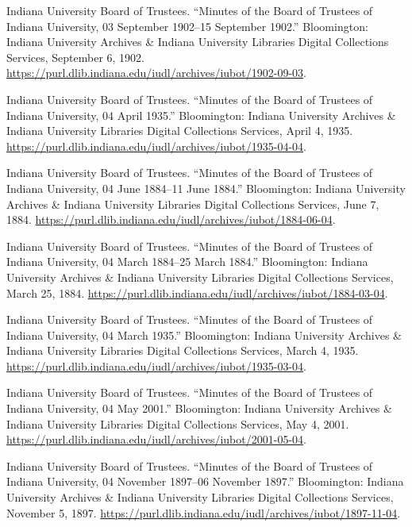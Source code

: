 \documentclass[
  american,
  letterpaper,
]{scrreprt}
\newlength{\cslhangindent}
\newenvironment{CSLReferences}[2] %
 {\begin{list}{}{%
  \setlength{\itemindent}{0pt}
  \setlength{\leftmargin}{0pt}
  \setlength{\parsep}{0pt}
  \ifodd #1
   \setlength{\leftmargin}{\cslhangindent}
   \setlength{\itemindent}{-1\cslhangindent}
  \fi
  \setlength{\itemsep}{#2\baselineskip}}}
 {\end{list}}
\begin{document}
\begin{CSLReferences}{1}{0}
Indiana University Board of Trustees. {``Minutes of the Board of
Trustees of Indiana University, 03 September 1902--15 September 1902.''}
Bloomington: Indiana University Archives \& Indiana University Libraries
Digital Collections Services, September 6, 1902.
\url{https://purl.dlib.indiana.edu/iudl/archives/iubot/1902-09-03}.

Indiana University Board of Trustees. {``Minutes of the Board of
Trustees of Indiana University, 04 April 1935.''} Bloomington: Indiana
University Archives \& Indiana University Libraries Digital Collections
Services, April 4, 1935.
\url{https://purl.dlib.indiana.edu/iudl/archives/iubot/1935-04-04}.

Indiana University Board of Trustees. {``Minutes of the Board of
Trustees of Indiana University, 04 June 1884--11 June 1884.''}
Bloomington: Indiana University Archives \& Indiana University Libraries
Digital Collections Services, June 7, 1884.
\url{https://purl.dlib.indiana.edu/iudl/archives/iubot/1884-06-04}.

Indiana University Board of Trustees. {``Minutes of the Board of
Trustees of Indiana University, 04 March 1884--25 March 1884.''}
Bloomington: Indiana University Archives \& Indiana University Libraries
Digital Collections Services, March 25, 1884.
\url{https://purl.dlib.indiana.edu/iudl/archives/iubot/1884-03-04}.

Indiana University Board of Trustees. {``Minutes of the Board of
Trustees of Indiana University, 04 March 1935.''} Bloomington: Indiana
University Archives \& Indiana University Libraries Digital Collections
Services, March 4, 1935.
\url{https://purl.dlib.indiana.edu/iudl/archives/iubot/1935-03-04}.

Indiana University Board of Trustees. {``Minutes of the Board of
Trustees of Indiana University, 04 May 2001.''} Bloomington: Indiana
University Archives \& Indiana University Libraries Digital Collections
Services, May 4, 2001.
\url{https://purl.dlib.indiana.edu/iudl/archives/iubot/2001-05-04}.

Indiana University Board of Trustees. {``Minutes of the Board of
Trustees of Indiana University, 04 November 1897--06 November 1897.''}
Bloomington: Indiana University Archives \& Indiana University Libraries
Digital Collections Services, November 5, 1897.
\url{https://purl.dlib.indiana.edu/iudl/archives/iubot/1897-11-04}.


\end{CSLReferences}
\end{document}
